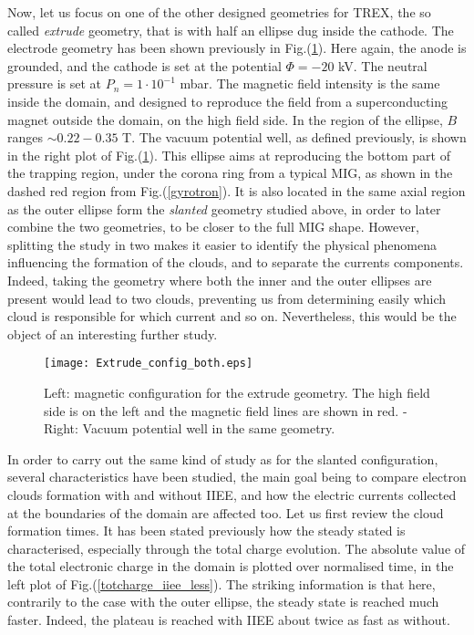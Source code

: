 Now, let us focus on one of the other designed geometries for TREX, the so called \emph{extrude} geometry, that is with half an ellipse dug inside the cathode. The electrode geometry has been shown previously in Fig.(\ref{extrude_config_both}). Here again, the anode is grounded, and the cathode is set at the potential $\Phi = -20$ kV. The neutral pressure is set at $P_n = 1\cdot 10^{-1}$ mbar. The magnetic field intensity is the same inside the domain, and designed to reproduce the field from a superconducting magnet outside the domain, on the high field side. In the region of the ellipse, $B$ ranges $\sim 0.22 - 0.35$ T. The vacuum potential well, as defined previously, is shown in the right plot of Fig.(\ref{extrude_config_both}). This ellipse aims at reproducing the bottom part of the trapping region, under the corona ring from a typical MIG, as shown in the dashed red region from Fig.(\ref{gyrotron}). It is also located in the same axial region as the outer ellipse form the \emph{slanted} geometry studied above, in order to later combine the two geometries, to be closer to the full MIG shape. However, splitting the study in two makes it easier to identify the physical phenomena influencing the formation of the clouds, and to separate the currents components. Indeed, taking the geometry where both the inner and the outer ellipses are present would lead to two clouds, preventing us from determining easily which cloud is responsible for which current and so on. Nevertheless, this would be the object of an interesting further study. \\


\begin{figure}[h!]
\centering
	\texttt{[image: Extrude\_config\_both.eps]}
	\caption{\label{extrude_config_both} Left: magnetic configuration for the extrude geometry. The high field side is on the left and the magnetic field lines are shown in red. - Right: Vacuum potential well in the same geometry.}
\end{figure}

In order to carry out the same kind of study as for the slanted configuration, several characteristics have been studied, the main goal being to compare electron clouds formation with and without IIEE, and how the electric currents collected at the boundaries of the domain are affected too. Let us first review the cloud formation times. It has been stated previously how the steady stated is characterised, especially through the total charge evolution. The absolute value of the total electronic charge in the domain is plotted over normalised time, in the left plot of Fig.(\ref{totcharge_iiee_less}). The striking information is that here, contrarily to the case with the outer ellipse, the steady state is reached much faster. Indeed, the plateau is reached with IIEE about twice as fast as without.\\

